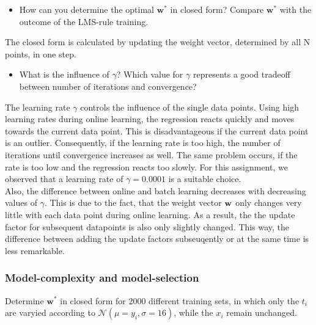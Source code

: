 \documentclass[a4]{article}
\begin{document}
\begin{itemize}
	\item How can you determine the optimal ${\mathbf w}^*$ in closed form? Compare ${\mathbf w}^*$ with the outcome of the LMS-rule training.
\end{itemize}
The closed form is calculated by updating the weight vector, determined by all N points, in one step.
\begin{itemize}	
	\item What is the influence of $\gamma$? Which value for $\gamma$ represents a good tradeoff between number of iterations and convergence? 
\end{itemize}
The learning rate $\gamma$ controls the influence of the single data points. Using high learning rates during online learning,  the regression reacts quickly and moves towards the current data point. This is disadvantageous if the current data point is an outlier. Consequently, if the learning rate is too high, the number of iterations until convergence increases as well. The same problem occurs, if the rate is too low and the regression reacts too slowly. For this assignment, we observed that a learning rate of $\gamma=0.0001$ is a suitable choice. \\
Also, the difference between online and batch learning decreases with decreasing values of $\gamma$. This is due to the fact, that the weight vector $\bf{w}$ only changes very little with each data point during online learning. As a result, the the update factor for subsequent datapoints is also only slightly changed. This way, the difference between adding the update factors subseuqently or at the same time is less remarkable. \\

\subsubsection{Model-complexity and model-selection}
Determine ${\mathbf w}^*$ in closed form for 2000 different training sets, in which only the $t_i$ are varyied according to $\mathcal{N}(\mu = y_i,\sigma = 16)$, while the $x_i$ remain unchanged. 
\end{document}
